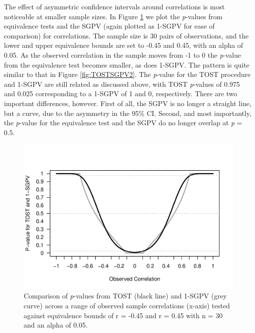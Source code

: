 \documentclass[,man,floatsintext]{apa6}
\begin{document}
The effect of asymmetric confidence intervals around correlations is
most noticeable at smaller sample sizes. In Figure \ref{fig:TOSTSGPV11}
we plot the \emph{p}-values from equivalence tests and the SGPV (again
plotted as 1-SGPV for ease of comparison) for correlations. The sample
size is 30 pairs of observations, and the lower and upper equivalence
bounds are set to -0.45 and 0.45, with an alpha of 0.05. As the observed
correlation in the sample moves from -1 to 0 the \emph{p}-value from the
equivalence test becomes smaller, as does 1-SGPV. The pattern is quite
similar to that in Figure \ref{fig:TOSTSGPV2}. The \emph{p}-value for
the TOST procedure and 1-SGPV are still related as discussed above, with
TOST \emph{p}-values of 0.975 and 0.025 corresponding to a 1-SGPV of 1
and 0, respectively. There are two important differences, however. First
of all, the SGPV is no longer a straight line, but a curve, due to the
asymmetry in the 95\% CI. Second, and most importantly, the
\emph{p}-value for the equivalence test and the SGPV do no longer
overlap at \emph{p} = 0.5.

\begin{figure}
\centering
\includegraphics{manuscript.R1_files/figure-latex/TOSTSGPV11-1.pdf}
\caption{\label{fig:TOSTSGPV11}Comparison of \emph{p}-values from TOST
(black line) and 1-SGPV (grey curve) across a range of observed sample
correlations (x-axis) tested against equivalence bounds of r = -0.45 and
r = 0.45 with n = 30 and an alpha of 0.05.}
\end{figure}
\end{document}
